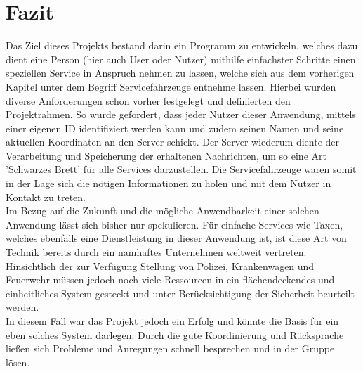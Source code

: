 \section{Fazit}
Das Ziel dieses Projekts bestand darin ein Programm zu entwickeln, welches dazu dient eine Person (hier auch User oder Nutzer) mithilfe einfachster Schritte einen speziellen Service in Anspruch nehmen zu lassen, welche sich aus dem vorherigen Kapitel unter dem Begriff Servicefahrzeuge entnehme lassen. Hierbei wurden diverse Anforderungen schon vorher festgelegt und definierten den Projektrahmen. So wurde gefordert, dass jeder Nutzer dieser Anwendung, mittels einer eigenen ID identifiziert werden kann und zudem seinen Namen und seine aktuellen Koordinaten an den Server schickt. Der Server wiederum diente der Verarbeitung und Speicherung der erhaltenen Nachrichten, um so eine Art 'Schwarzes Brett' für alle Services darzustellen. Die Servicefahrzeuge waren somit in der Lage sich die nötigen Informationen zu holen und mit dem Nutzer in Kontakt zu treten.\\
Im Bezug auf die Zukunft und die mögliche Anwendbarkeit einer solchen Anwendung lässt sich bisher nur spekulieren. Für einfache Services wie Taxen, welches ebenfalls eine Dienstleistung in dieser Anwendung ist, ist diese Art von Technik bereits durch ein namhaftes Unternehmen weltweit vertreten. Hinsichtlich der zur Verfügung Stellung von Polizei, Krankenwagen und Feuerwehr müssen jedoch noch viele Ressourcen in ein flächendeckendes und einheitliches System gesteckt und unter Berücksichtigung der Sicherheit beurteilt werden.\\
In diesem Fall war das Projekt jedoch ein Erfolg und könnte die Basis für ein eben solches System darlegen. Durch die gute Koordinierung und Rücksprache ließen sich Probleme und Anregungen schnell besprechen und in der Gruppe lösen.